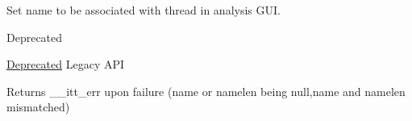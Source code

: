 Set name to be associated with thread in analysis G\+U\+I. 

\begin{DoxyRefDesc}{Deprecated}
\item[\hyperlink{deprecated__deprecated000006}{Deprecated}]Legacy A\+P\+I \end{DoxyRefDesc}
\begin{DoxyReturn}{Returns}
\+\_\+\+\_\+itt\+\_\+err upon failure (name or namelen being null,name and namelen mismatched) 
\end{DoxyReturn}

